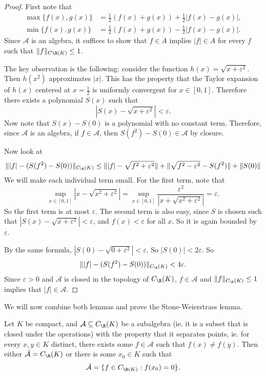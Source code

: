 \documentclass[a4paper]{article}
\begin{document}
\begin{proof}
  First note that
  \begin{align*}
    \max\{f(x), g(x)\} &= \frac{1}{2}(f(x) + g(x)) + \frac{1}{2}|f(x) - g(x)|,\\
    \min\{f(x), g(x)\} &= \frac{1}{2}(f(x) + g(x)) - \frac{1}{2}|f(x) - g(x)|.
  \end{align*}
  Since $\mathcal{A}$ is an algebra, it suffices to show that $f \in A$ implies $|f| \in A$ for every $f$ such that $\|f\|_{C\R(K)} \leq 1$.

  The key observation is the following: consider the function $h(x) = \sqrt{x + \varepsilon^2}$. Then $h(x^2)$ approximates $|x|$. This has the property that the Taylor expansion of $h(x)$ centered at $x = \frac{1}{2}$ is uniformly convergent for $x \in [0, 1]$. Therefore there exists a polynomial $S(x)$ such that
  \[
    |S(x) - \sqrt{x + \varepsilon^2}| < \varepsilon.
  \]
  Now note that $S(x) - S(0)$ is a polynomial with no constant term. Therefore, since $\mathcal{A}$ is an algebra, if $f \in \mathcal{A}$, then $S(f^2) - S(0) \in \mathcal{A}$ by closure.

  Now look at
  \[
    \||f| - (S(f^2) - S(0))\|_{C_\R(K)} \leq \||f| - \sqrt{f^2 + \varepsilon^2}\| + \|\sqrt{f^2 - \varepsilon^2} - S(f^2)\| + \|S(0)\|
  \]
  We will make each individual term small. For the first term, note that
  \[
    \sup_{x \in [0, 1]} |x - \sqrt{x^2 + \varepsilon^2}| = \sup_{x \in [0, 1]} \frac{\varepsilon^2}{|x + \sqrt{x^2 + \varepsilon^2}|} = \varepsilon.
  \]
  So the first term is at most $\varepsilon$. The second term is also easy, since $S$ is chosen such that $|S(x) - \sqrt{x + \varepsilon^2}| < \varepsilon$, and $f(x) < \varepsilon$ for all $x$. So it is again bounded by $\varepsilon$.

  By the same formula, $|S(0) - \sqrt{0 + \varepsilon^2}| < \varepsilon$. So $|S(0)| < 2\varepsilon$. So
  \[
    \||f| - (S(f^2) - S(0))\|_{C_\R(K)} < 4\varepsilon.
  \]
  Since $\varepsilon > 0$ and $\mathcal{A}$ is closed in the topology of $C_{\R}(K)$, $f\in \mathcal{A}$ and $\|f\|_{C_\R(K)} \leq 1$ implies that $|f| \in \mathcal{A}$.
\end{proof}

We will now combine both lemmas and prove the Stone-Weierstrass lemma.
\begin{thm}
  Let $K$ be compact, and $\mathcal{A} \subseteq C_{\R}(K)$ be a subalgebra (ie. it is a subset that is closed under the operations) with the property that it separates points, ie. for every $x, y \in K$ distinct, there exists some $f \in \mathcal{A}$ such that $f(x) \not= f(y)$. Then either $\bar{\mathcal{A}} = C_\R(K)$ or there is some $x_0 \in K$ such that
  \[
    \bar{\mathcal{A}} = \{f \in C_{\R(K)}: f(x_0) = 0\}.
  \]
\end{thm}
\end{document}
